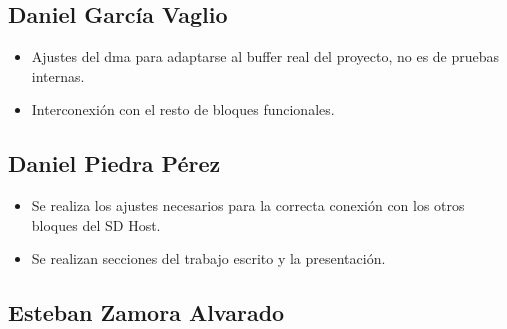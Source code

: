 \subsection{Daniel García Vaglio}
\begin{itemize}
\item Ajustes del dma para adaptarse al buffer real del proyecto, no es de pruebas internas.
\item Interconexión con el resto de bloques funcionales. 
\end{itemize}
\subsection{Daniel Piedra Pérez}
\begin{itemize}
\item Se realiza los ajustes necesarios para la correcta conexión con los otros bloques del SD Host.
\item Se realizan secciones del trabajo escrito y la presentación.

\end{itemize}

\subsection{Esteban Zamora Alvarado}

\newpage


